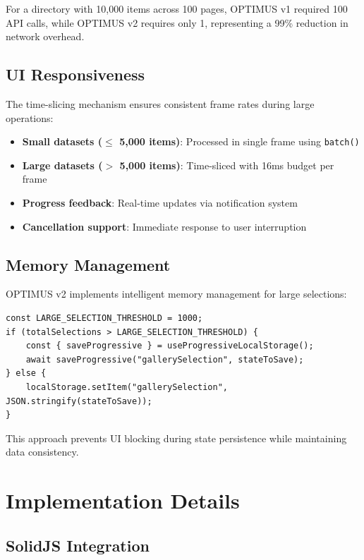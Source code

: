 \documentclass[10pt]{article}
\begin{document}
For a directory with 10,000 items across 100 pages, OPTIMUS v1 required 100 API calls, while OPTIMUS v2 requires only 1, representing a 99\% reduction in network overhead.

\subsection{UI Responsiveness}

The time-slicing mechanism ensures consistent frame rates during large operations:

\begin{itemize}
    \item \textbf{Small datasets ($\leq$ 5,000 items)}: Processed in single frame using \texttt{batch()}
    \item \textbf{Large datasets ($>$ 5,000 items)}: Time-sliced with 16ms budget per frame
    \item \textbf{Progress feedback}: Real-time updates via notification system
    \item \textbf{Cancellation support}: Immediate response to user interruption
\end{itemize}

\subsection{Memory Management}

OPTIMUS v2 implements intelligent memory management for large selections:

\begin{lstlisting}[caption={Progressive localStorage Implementation}]
const LARGE_SELECTION_THRESHOLD = 1000;
if (totalSelections > LARGE_SELECTION_THRESHOLD) {
    const { saveProgressive } = useProgressiveLocalStorage();
    await saveProgressive("gallerySelection", stateToSave);
} else {
    localStorage.setItem("gallerySelection", JSON.stringify(stateToSave));
}
\end{lstlisting}

This approach prevents UI blocking during state persistence while maintaining data consistency.

\section{Implementation Details}

\subsection{SolidJS Integration}
\end{document}
